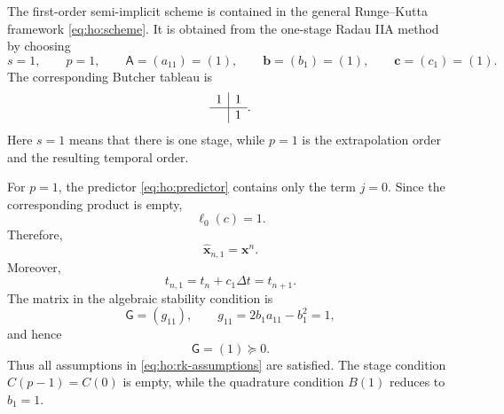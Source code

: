 \documentclass[11pt,a4paper]{article}
\newcommand{\bs}{\boldsymbol}
\newcommand{\dt}{\Delta t}
\theoremstyle{definition}
\numberwithin{equation}{section}
\begin{document}
The first-order semi-implicit scheme is contained in the general
Runge--Kutta framework \eqref{eq:ho:scheme}. It is obtained from the
one-stage Radau IIA method by choosing
\begin{equation}\label{eq:BE-RK-coefficients}
 s=1,\qquad
 p=1,\qquad
 \mathsf A=(a_{11})=(1),\qquad
 \bs b=(b_1)=(1),\qquad
 \bs c=(c_1)=(1).
\end{equation}
The corresponding Butcher tableau is
\begin{equation}\label{eq:BE-tableau}
\begin{array}{c|c}
1&1\\
\hline
&1
\end{array}.
\end{equation}
Here \(s=1\) means that there is one stage, while \(p=1\) is the
extrapolation order and the resulting temporal order.

For \(p=1\), the predictor \eqref{eq:ho:predictor} contains only the
term \(j=0\). Since the corresponding product is empty,
\[
 \ell_0(c)=1.
\]
Therefore,
\begin{equation}\label{eq:BE-predictor}
 \widehat{\bs x}_{n,1}=\bs x^n.
\end{equation}
Moreover,
\[
 t_{n,1}=t_n+c_1\dt=t_{n+1}.
\]
The matrix in the algebraic stability condition is
\begin{equation}\label{eq:BE-G}
 \mathsf G=(g_{11}),\qquad
 g_{11}=2b_1a_{11}-b_1^2=1,
\end{equation}
and hence
\[
 \mathsf G=(1)\succeq0.
\]
Thus all assumptions in \eqref{eq:ho:rk-assumptions} are satisfied.
The stage condition \(C(p-1)=C(0)\) is empty, while the quadrature
condition \(B(1)\) reduces to \(b_1=1\).
\end{document}
